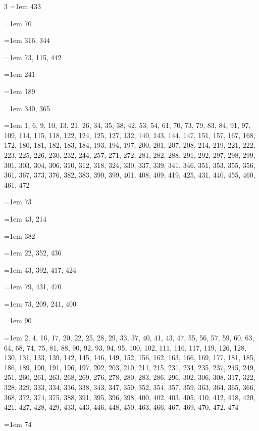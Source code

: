 \begin{multicols}{3}
\hangindent=1em  433\par
\hangindent=1em  70\par
\hangindent=1em  316, 344\par
\hangindent=1em  73, 115, 442\par
\hangindent=1em  241\par
\hangindent=1em  189\par
\hangindent=1em  340, 365\par
\hangindent=1em  1, 6, 9, 10, 13, 21, 26, 34, 35, 38, 42, 53, 54, 61, 70, 73, 79, 83, 84, 91, 97, 109, 114, 115, 118, 122, 124, 125, 127, 132, 140, 143, 144, 147, 151, 157, 167, 168, 172, 180, 181, 182, 183, 184, 193, 194, 197, 200, 201, 207, 208, 214, 219, 221, 222, 223, 225, 226, 230, 232, 244, 257, 271, 272, 281, 282, 288, 291, 292, 297, 298, 299, 301, 303, 304, 306, 310, 312, 318, 324, 330, 337, 339, 341, 346, 351, 353, 355, 356, 361, 367, 373, 376, 382, 383, 390, 399, 401, 408, 409, 419, 425, 431, 440, 455, 460, 461, 472\par
\hangindent=1em  73\par
\hangindent=1em  43, 214\par
\hangindent=1em  382\par
\hangindent=1em  22, 352, 436\par
\hangindent=1em  43, 392, 417, 424\par
\hangindent=1em  79, 431, 470\par
\hangindent=1em  73, 209, 241, 400\par
\hangindent=1em  90\par
\hangindent=1em  2, 4, 16, 17, 20, 22, 25, 28, 29, 33, 37, 40, 41, 43, 47, 55, 56, 57, 59, 60, 63, 64, 68, 74, 75, 81, 88, 90, 92, 93, 94, 95, 100, 102, 111, 116, 117, 119, 126, 128, 130, 131, 133, 139, 142, 145, 146, 149, 152, 156, 162, 163, 166, 169, 177, 181, 185, 186, 189, 190, 191, 196, 197, 202, 203, 210, 211, 215, 231, 234, 235, 237, 245, 249, 251, 260, 261, 263, 268, 269, 276, 278, 280, 283, 286, 296, 302, 306, 308, 317, 322, 328, 329, 333, 334, 336, 338, 343, 347, 350, 352, 354, 357, 359, 363, 364, 365, 366, 368, 372, 374, 375, 388, 391, 395, 396, 398, 400, 402, 403, 405, 410, 412, 418, 420, 421, 427, 428, 429, 433, 443, 446, 448, 450, 463, 466, 467, 469, 470, 472, 474\par
\hangindent=1em  74\par

\end{multicols}
